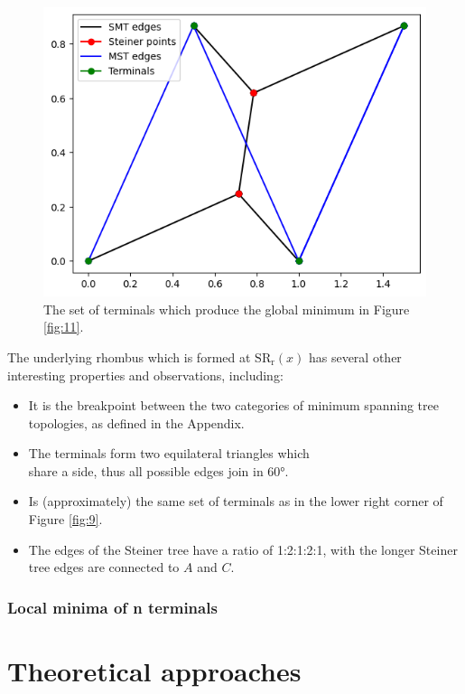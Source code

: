 \documentclass{mpaper}
\begin{document}
\begin{figure}[h!]
  \begin{center}
  \includegraphics[scale=0.5]{plot11.png}
  \end{center}
  \caption{\label{fig:12} The set of terminals which produce the global minimum in Figure \ref{fig:11}.}
\end{figure}

The underlying rhombus which is formed at $\operatorname{SR_r}(x)$ has several other interesting properties and observations, including:
\begin{itemize}
  \item It is the breakpoint between the two categories of minimum spanning tree topologies, as defined in the Appendix.
  \item The terminals form two equilateral triangles which\\share a side, thus all possible edges join in 60°.
  \item Is (approximately) the same set of terminals as in the lower right corner of Figure \ref{fig:9}.
  \item The edges of the Steiner tree have a ratio of 1:2:1:2:1, with the longer Steiner tree edges are connected to $A$ and $C$.
\end{itemize}

\subsubsection{Local minima of n terminals}

\section{Theoretical approaches}
\end{document}
